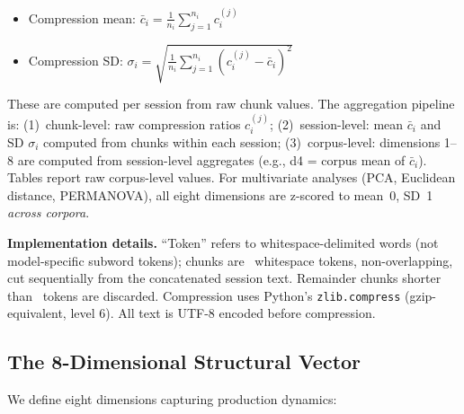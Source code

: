 \documentclass[11pt]{article}
\begin{document}
\begin{itemize}
\item Compression mean: $\bar{c}_i = \frac{1}{n_i} \sum_{j=1}^{n_i} c_i^{(j)}$
\item Compression SD: $\sigma_i = \sqrt{\frac{1}{n_i} \sum_{j=1}^{n_i} (c_i^{(j)} - \bar{c}_i)^2}$
\end{itemize}

These are computed per session from raw chunk values. The aggregation pipeline is: (1)~chunk-level: raw compression ratios $c_i^{(j)}$; (2)~session-level: mean $\bar{c}_i$ and SD $\sigma_i$ computed from chunks within each session; (3)~corpus-level: dimensions 1--8 are computed from session-level aggregates (e.g., d4 = corpus mean of $\bar{c}_i$). Tables report raw corpus-level values. For multivariate analyses (PCA, Euclidean distance, PERMANOVA), all eight dimensions are z-scored to mean~0, SD~1 \textit{across corpora}.

\textbf{Implementation details.} ``Token'' refers to whitespace-delimited words (not model-specific subword tokens); chunks are \chunkTokens\ whitespace tokens, non-overlapping, cut sequentially from the concatenated session text. Remainder chunks shorter than \chunkTokens\ tokens are discarded. Compression uses Python's \texttt{zlib.compress} (gzip-equivalent, level 6). All text is UTF-8 encoded before compression.

\subsection{The 8-Dimensional Structural Vector}
\label{sec:recovery-def}

We define eight dimensions capturing production dynamics:
\end{document}

